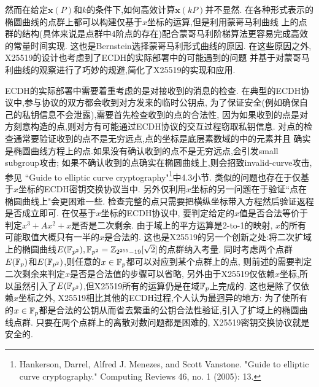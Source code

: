 然而在给定$\mathbf{x}(P)$和$k$的条件下,如何高效计算$\mathbf{x}(kP)$并不显然.
在各种形式表示的椭圆曲线的点群上都可以构建仅基于$x$坐标的运算,但是利用蒙哥马利曲线
上的点群的结构(具体来说是点群中4阶点的存在)配合蒙哥马利阶梯算法更容易完成高效的常量时间实现.
这也是Bernstein选择蒙哥马利形式曲线的原因.
在这些原因之外, X25519的设计也考虑到了ECDH的实际部署中的可能遇到的问题
并基于对蒙哥马利曲线的观察进行了巧妙的规避,简化了X25519的实现和应用.

ECDH的实际部署中需要着重考虑的是对接收到的消息的检查.
在典型的ECDH协议中,参与协议的双方都会收到对方发来的临时公钥点,
为了保证安全(例如确保自己的私钥信息不会泄露),需要首先检查收到的点的合法性,
因为如果收到的点是对方刻意构造的点,则对方有可能通过ECDH协议的交互过程窃取私钥信息.
对点的检查通常要验证收到的点不是无穷远点,点的坐标是底层素数域的中的元素并且
确实是椭圆曲线方程上的点.如果没有确认收到的点不是无穷远点,会引发small subgroup攻击;
如果不确认收到的点确实在椭圆曲线上,则会招致invalid-curve攻击,参见
``Guide to elliptic curve cryptography"\footnote{
Hankerson, Darrel, Alfred J. Menezes, and Scott Vanstone. "Guide to elliptic curve cryptography." 
Computing Reviews 46, no. 1 (2005): 13.}中4.3小节.
类似的问题也存在于仅基于$x$坐标的ECDH密钥交换协议当中.
另外仅利用$x$坐标的另一问题在于验证``点在椭圆曲线上"会更困难一些.
检查完整的点只需要把横纵坐标带入方程然后验证返程是否成立即可.
在仅基于$x$坐标的ECDH协议中,
要判定给定的$x$值是否合法等价于判定$x^3+Ax^2+x$是否是二次剩余.
由于域上的平方运算是2-to-1的映射, $x$的所有可能取值大概只有一半的$x$是合法的.
这也是X25519的另一个创新之处:将二次扩域上的椭圆曲线$E(\mathbb{F}_{p^2}), 
\mathbb{F}_{p^2} = \mathbb{Z}_{2^{255}-19}[\sqrt{2}]$的点群纳入考量.
同时考虑两个点群$E(\mathbb{F}_{p})$和$E(\mathbb{F}_{p^2})$,则任意的$x\in\mathbb{F}_p$都可以对应到某个点群上的点,
则前述的需要判定二次剩余来判定$x$是否是合法值的步骤可以省略,
另外由于X25519仅依赖$x$坐标,所以虽然引入了$E(\mathbb{F}_{p^2})$,但X25519所有的运算仍是在域$\mathbb{F}_p$上完成的.
这也是除了仅依赖$x$坐标之外, X25519相比其他的ECDH过程,个人认为最迥异的地方:
为了使所有的$x\in\mathbb{F}_p$都是合法的公钥从而省去繁重的公钥合法性验证,引入了扩域上的椭圆曲线点群.
只要在两个点群上的离散对数问题都是困难的, X25519密钥交换协议就是安全的.

